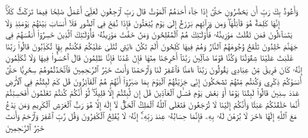 وَأَعُوذُ بِكَ رَبِّ أَن يَحۡضُرُونِ
حَتَّىٰٓ إِذَا جَآءَ أَحَدَهُمُ ٱلۡمَوۡتُ قَالَ رَبِّ ٱرۡجِعُونِ
لَعَلِّيٓ أَعۡمَلُ صَٰلِحٗا فِيمَا تَرَكۡتُۚ كَلَّآۚ إِنَّهَا كَلِمَةٌ هُوَ قَآئِلُهَاۖ وَمِن وَرَآئِهِم بَرۡزَخٌ إِلَىٰ يَوۡمِ يُبۡعَثُونَ
فَإِذَا نُفِخَ فِي ٱلصُّورِ فَلَآ أَنسَابَ بَيۡنَهُمۡ يَوۡمَئِذٖ وَلَا يَتَسَآءَلُونَ
فَمَن ثَقُلَتۡ مَوَٰزِينُهُۥ فَأُوْلَـٰٓئِكَ هُمُ ٱلۡمُفۡلِحُونَ
وَمَنۡ خَفَّتۡ مَوَٰزِينُهُۥ فَأُوْلَـٰٓئِكَ ٱلَّذِينَ خَسِرُوٓاْ أَنفُسَهُمۡ فِي جَهَنَّمَ خَٰلِدُونَ
تَلۡفَحُ وُجُوهَهُمُ ٱلنَّارُ وَهُمۡ فِيهَا كَٰلِحُونَ
أَلَمۡ تَكُنۡ ءَايَٰتِي تُتۡلَىٰ عَلَيۡكُمۡ فَكُنتُم بِهَا تُكَذِّبُونَ
قَالُواْ رَبَّنَا غَلَبَتۡ عَلَيۡنَا شِقۡوَتُنَا وَكُنَّا قَوۡمٗا ضَآلِّينَ
رَبَّنَآ أَخۡرِجۡنَا مِنۡهَا فَإِنۡ عُدۡنَا فَإِنَّا ظَٰلِمُونَ
قَالَ ٱخۡسَـُٔواْ فِيهَا وَلَا تُكَلِّمُونِ
إِنَّهُۥ كَانَ فَرِيقٞ مِّنۡ عِبَادِي يَقُولُونَ رَبَّنَآ ءَامَنَّا فَٱغۡفِرۡ لَنَا وَٱرۡحَمۡنَا وَأَنتَ خَيۡرُ ٱلرَّـٰحِمِينَ
فَٱتَّخَذۡتُمُوهُمۡ سِخۡرِيًّا حَتَّىٰٓ أَنسَوۡكُمۡ ذِكۡرِي وَكُنتُم مِّنۡهُمۡ تَضۡحَكُونَ
إِنِّي جَزَيۡتُهُمُ ٱلۡيَوۡمَ بِمَا صَبَرُوٓاْ أَنَّهُمۡ هُمُ ٱلۡفَآئِزُونَ
قَٰلَ كَمۡ لَبِثۡتُمۡ فِي ٱلۡأَرۡضِ عَدَدَ سِنِينَ
قَالُواْ لَبِثۡنَا يَوۡمًا أَوۡ بَعۡضَ يَوۡمٖ فَسۡـَٔلِ ٱلۡعَآدِّينَ
قَٰلَ إِن لَّبِثۡتُمۡ إِلَّا قَلِيلٗاۖ لَّوۡ أَنَّكُمۡ كُنتُمۡ تَعۡلَمُونَ
أَفَحَسِبۡتُمۡ أَنَّمَا خَلَقۡنَٰكُمۡ عَبَثٗا وَأَنَّكُمۡ إِلَيۡنَا لَا تُرۡجَعُونَ
فَتَعَٰلَى ٱللَّهُ ٱلۡمَلِكُ ٱلۡحَقُّۖ لَآ إِلَٰهَ إِلَّا هُوَ رَبُّ ٱلۡعَرۡشِ ٱلۡكَرِيمِ
وَمَن يَدۡعُ مَعَ ٱللَّهِ إِلَٰهًا ءَاخَرَ لَا بُرۡهَٰنَ لَهُۥ بِهِۦ فَإِنَّمَا حِسَابُهُۥ عِندَ رَبِّهِۦٓۚ إِنَّهُۥ لَا يُفۡلِحُ ٱلۡكَٰفِرُونَ
وَقُل رَّبِّ ٱغۡفِرۡ وَٱرۡحَمۡ وَأَنتَ خَيۡرُ ٱلرَّـٰحِمِينَ